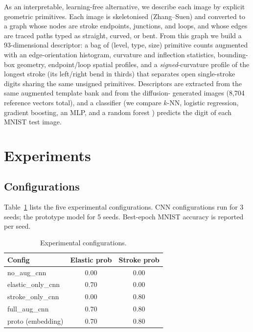 \documentclass[final,5p,times,twocolumn]{elsarticle}
\begin{document}
As an interpretable, learning-free alternative, we describe each image by explicit
geometric primitives.
Each image is skeletonised (Zhang--Suen) and converted to a graph whose nodes are stroke
endpoints, junctions, and loops, and whose edges are traced paths typed as straight, curved,
or bent.
From this graph we build a 93-dimensional descriptor: a bag of (level, type, size)
primitive counts augmented with an edge-orientation histogram, curvature and inflection
statistics, bounding-box geometry, endpoint/loop spatial profiles, and a
\emph{signed}-curvature profile of the longest stroke (its left/right bend in thirds) that
separates open single-stroke digits sharing the same unsigned primitives.
Descriptors are extracted from the same augmented template bank and from the diffusion-%
generated images (8{,}704 reference vectors total), and a classifier (we compare
$k$-NN, logistic regression, gradient boosting, an MLP, and a random forest
\cite{Breiman2001}) predicts the digit of each MNIST test image.

\section{Experiments}

\subsection{Configurations}

Table~\ref{tab:configs} lists the five experimental configurations.
CNN configurations run for 3 seeds; the prototype model for 5 seeds.
Best-epoch MNIST accuracy is reported per seed.

\begin{table}[t]
  \caption{Experimental configurations.}
  \label{tab:configs}
  \centering
  \begin{tabular}{@{}lcc@{}}
    \toprule
    Config & Elastic prob & Stroke prob \\
    \midrule
    no\_aug\_cnn      & 0.00 & 0.00 \\
    elastic\_only\_cnn & 0.70 & 0.00 \\
    stroke\_only\_cnn  & 0.00 & 0.80 \\
    full\_aug\_cnn    & 0.70 & 0.80 \\
    proto (embedding) & 0.70 & 0.80 \\
    \bottomrule
  \end{tabular}
\end{table}
\end{document}
